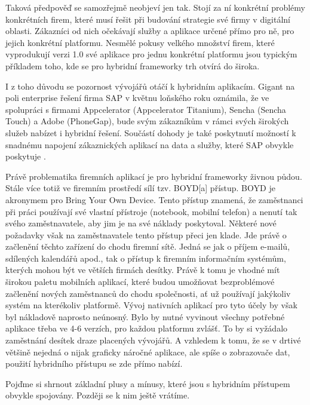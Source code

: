 Taková předpověď se samozřejmě neobjeví jen tak. Stojí za ní konkrétní problémy konkrétních firem, které musí řešit při budování strategie své firmy v digitální oblasti. Zákazníci od nich očekávají služby a aplikace určené přímo pro ně, pro jejich konkrétní platformu. Nesmělé pokusy velkého množství firem, které vyprodukují verzi 1.0 své aplikace pro jednu konkrétní platformu jsou typickým příkladem toho, kde se pro hybridní frameworky trh otvírá do široka.

I z toho důvodu se pozornost vývojářů otáčí k hybridním aplikacím. Gigant na poli enterprise řešení firma SAP v květnu loňského roku oznámila, že ve spolupráci s firmami Appcelerator (Appcelerator Titanium), Sencha (Sencha Touch) a Adobe (PhoneGap), bude svým zákazníkům v rámci svých širokých služeb nabízet i hybridní řešení. Součástí dohody je také poskytnutí možností k snadnému napojení zákaznických aplikací na data a služby, které SAP obvykle poskytuje \cite{bii_hybrid_apps_report}.

Právě problematika firemních aplikací je pro hybridní frameworky živnou půdou. Stále více totiž ve firemním prostředí sílí tzv. BOYD[a] přístup. BOYD je akronymem pro Bring Your Own Device. Tento přístup znamená, že zaměstnanci při práci používají své vlastní přístroje (notebook, mobilní telefon) a nenutí tak svého zaměstnavatele, aby jim je na své náklady poskytoval. Některé nové požadavky však na zaměstnavatele tento přístup přeci jen klade. Jde právě o začlenění těchto zařízení do chodu firemní sítě. Jedná se jak o příjem e-mailů, sdílených kalendářů apod., tak o přístup k firemním informačním systémům, kterých mohou být ve větších firmách desítky. Právě k tomu je vhodné mít širokou paletu mobilních aplikací, které budou umožňovat bezproblémové začlenění nových zaměstnanců do chodu společnosti, ať už používají jakýkoliv systém na kterékoliv platformě. Vývoj nativních aplikací pro tyto účely by však byl nákladově naprosto neúnosný. Bylo by nutné vyvinout všechny potřebné aplikace třeba ve 4-6 verzích, pro každou platformu zvlášť. To by si vyžádalo zaměstnání desítek draze placených vývojářů. A vzhledem k tomu, že se v drtivé většině nejedná o nijak graficky náročné aplikace, ale spíše o zobrazovače dat, použití hybridního přístupu se zde přímo nabízí. 

Pojďme si shrnout základní plusy a mínusy, které jsou s hybridním přístupem obvykle spojovány. Později se k nim ještě vrátíme.

